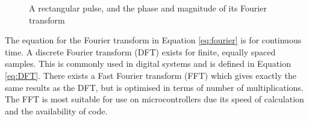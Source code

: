 \begin{figure}
\centering
{}
\caption{A rectangular pulse, and the phase and magnitude of its Fourier transform}
\label{fig:SquareWaveFT}
\end{figure}

The equation for the Fourier transform in Equation \eqref{eq:fourier} is for continuous time. A discrete Fourier transform (DFT) exists for finite, equally spaced samples. This is commonly used in digital systems and is defined in Equation \eqref{eq:DFT}. There exists a Fast Fourier transform (FFT) which gives exactly the same results as the DFT, but is optimised in terms of number of multiplications. The FFT is most suitable for use on microcontrollers due its speed of calculation and the availability of code. %

